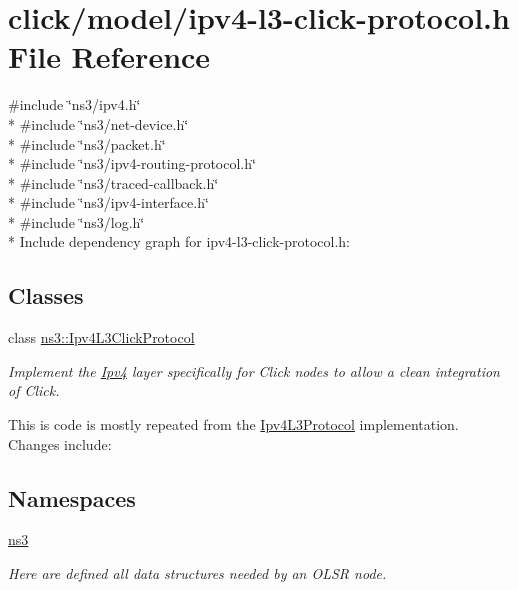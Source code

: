 \hypertarget{ipv4-l3-click-protocol_8h}{}\section{click/model/ipv4-\/l3-\/click-\/protocol.h File Reference}
\label{ipv4-l3-click-protocol_8h}
{\ttfamily \#include \char`\"{}ns3/ipv4.\+h\char`\"{}}\\*
{\ttfamily \#include \char`\"{}ns3/net-\/device.\+h\char`\"{}}\\*
{\ttfamily \#include \char`\"{}ns3/packet.\+h\char`\"{}}\\*
{\ttfamily \#include \char`\"{}ns3/ipv4-\/routing-\/protocol.\+h\char`\"{}}\\*
{\ttfamily \#include \char`\"{}ns3/traced-\/callback.\+h\char`\"{}}\\*
{\ttfamily \#include \char`\"{}ns3/ipv4-\/interface.\+h\char`\"{}}\\*
{\ttfamily \#include \char`\"{}ns3/log.\+h\char`\"{}}\\*
Include dependency graph for ipv4-\/l3-\/click-\/protocol.h\+:
\subsection*{Classes}
\begin{DoxyCompactItemize}
\item 
class \hyperlink{classns3_1_1Ipv4L3ClickProtocol}{ns3\+::\+Ipv4\+L3\+Click\+Protocol}
\begin{DoxyCompactList}\small\item\em Implement the \hyperlink{classns3_1_1Ipv4}{Ipv4} layer specifically for Click nodes to allow a clean integration of Click.

This is code is mostly repeated from the \hyperlink{classns3_1_1Ipv4L3Protocol}{Ipv4\+L3\+Protocol} implementation. Changes include\+: \end{DoxyCompactList}\end{DoxyCompactItemize}
\subsection*{Namespaces}
\begin{DoxyCompactItemize}
\item 
 \hyperlink{namespacens3}{ns3}
\begin{DoxyCompactList}\small\item\em Here are defined all data structures needed by an O\+L\+SR node. \end{DoxyCompactList}\end{DoxyCompactItemize}
